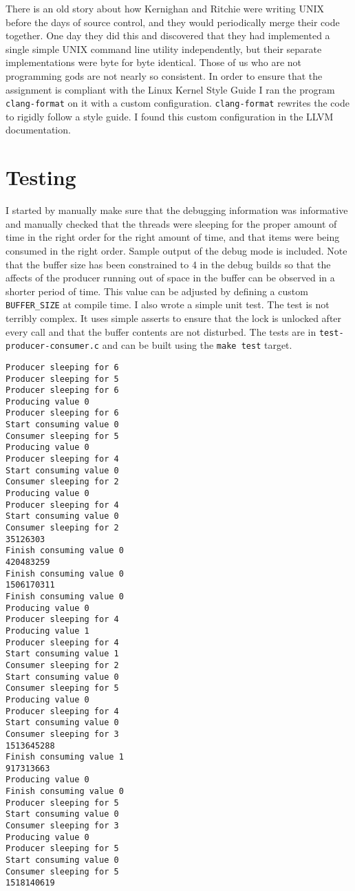 \documentclass[10pt,conference,draftclsnofoot,onecolumn]{IEEEtran}
\begin{document}
There is an old story about how Kernighan and Ritchie were writing UNIX before the days of source control, and they would periodically merge their code together. One day they did this and discovered that they had implemented a single simple UNIX command line utility independently, but their separate implementations were byte for byte identical. Those of us who are not programming gods are not nearly so consistent. In order to ensure that the assignment is compliant with the Linux Kernel Style Guide I ran the program \texttt{clang-format} on it with a custom configuration. \texttt{clang-format} rewrites the code to rigidly follow a style guide. I found this custom configuration in the LLVM documentation.

\section{Testing}
I started by manually make sure that the debugging information was informative and manually checked that the threads were sleeping for the proper amount of time in the right order for the right amount of time, and that items were being consumed in the right order. Sample output of the debug mode is included. Note that the buffer size has been constrained to 4 in the debug builds so that the affects of the producer running out of space in the buffer can be observed in a shorter period of time. This value can be adjusted by defining a custom \texttt{BUFFER\_SIZE} at compile time. I also wrote a simple unit test. The test is not terribly complex. It uses simple asserts to ensure that the lock is unlocked after every call and that the buffer contents are not disturbed. The tests are in \texttt{test-producer-consumer.c} and can be built using the \texttt{make test} target.


\begin{verbatim}
Producer sleeping for 6
Producer sleeping for 5
Producer sleeping for 6
Producing value 0
Producer sleeping for 6
Start consuming value 0
Consumer sleeping for 5
Producing value 0
Producer sleeping for 4
Start consuming value 0
Consumer sleeping for 2
Producing value 0
Producer sleeping for 4
Start consuming value 0
Consumer sleeping for 2
35126303
Finish consuming value 0
420483259
Finish consuming value 0
1506170311
Finish consuming value 0
Producing value 0
Producer sleeping for 4
Producing value 1
Producer sleeping for 4
Start consuming value 1
Consumer sleeping for 2
Start consuming value 0
Consumer sleeping for 5
Producing value 0
Producer sleeping for 4
Start consuming value 0
Consumer sleeping for 3
1513645288
Finish consuming value 1
917313663
Producing value 0
Finish consuming value 0
Producer sleeping for 5
Start consuming value 0
Consumer sleeping for 3
Producing value 0
Producer sleeping for 5
Start consuming value 0
Consumer sleeping for 5
1518140619
\end{verbatim}
\end{document}
